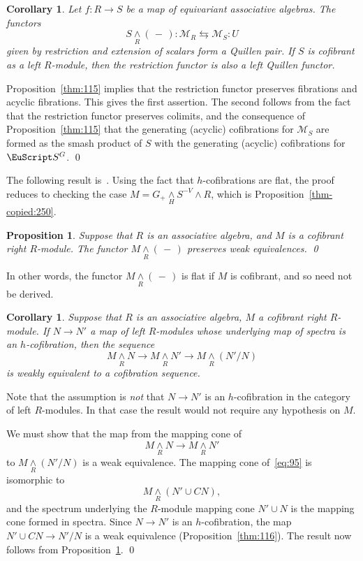 \documentclass{amsart}
\newtheorem{cor}[equation]{Corollary}
\newtheorem{prop}[equation]{Proposition}
\theoremstyle{definition}
\theoremstyle{remark}
\newenvironment{pf}{\bigskip{\em Proof:\/}}{\qed\medskip}
\newcommand{\slot}{\,-\,}
\newcommand{\spectra}{\EuScript S}
\newcommand{\rmod}[1]{\mathcal M_{#1}}
\newcommand{\smashove}[1]{\underset{#1}{\wedge}}
\newcommand{\ugspectra}[1]{\spectra^{#1}}
\begin{document}
\begin{cor}
\label{thm:13}
Let $f:R\to S$ be a map of equivariant associative  algebras.   The
functors 
\[
S\smashove{R}(\slot): \rmod{R} \leftrightarrows \rmod{S}:U
\]
given by restriction and extension of scalars form a Quillen pair.  If
$S$ is cofibrant as a left $R$-module, then the restriction functor is
also a left Quillen functor.
\end{cor}

\begin{pf}
Proposition~\ref{thm:115} implies that the restriction functor
preserves fibrations and acyclic fibrations.  This gives the first
assertion.  The second follows from the fact that the restriction
functor preserves colimits, and the consequence of
Proposition~\ref{thm:115} that the generating (acyclic) cofibrations
for $\rmod{S}$ are formed as the smash product of $S$ with the
generating (acyclic) cofibrations for $\ugspectra{G}$.
\end{pf}

The following result is~\cite[Proposition~III.7.7]{MR1922205}.  Using
the fact that $h$-cofibrations are flat, the proof reduces to checking
the case $M=G_{+}\smashove{H}S^{-V}\wedge R$, which is
Proposition~\ref{thm-copied:250}.

\begin{prop}
\label{thm:48} Suppose that $R$ is an associative algebra, and $M$ is
a cofibrant right $R$-module.  The functor $M\smashove{R}(\slot)$
preserves weak equivalences.  \qed
\end{prop}

In other words, the functor $M\smashove{R}(\slot)$ is flat if $M$ is
cofibrant, and so need not be derived.   

\begin{cor}
\label{thm:102}
Suppose that $R$ is an associative algebra, $M$ a cofibrant right
$R$-module.   If $N\to N'$ a map of left $R$-modules whose underlying
map of spectra is an $h$-cofibration, then the sequence 
\[
M\smashove{R}N \to M\smashove{R}N' \to M\smashove{R}(N'/N)
\]
is weakly equivalent to a cofibration sequence.   
\end{cor}

Note that the assumption is {\em not} that $N\to N'$ is an
$h$-cofibration in the category of left $R$-modules.  In that case the
result would not require any hypothesis on $M$.

\begin{pf}
We must show that the map from the mapping cone of  
\begin{equation}
\label{eq:95}
M\smashove{R}N \to
M\smashove{R}N'
\end{equation}
to $M\smashove{R}(N'/N)$ is a weak equivalence.  The mapping cone
of~\eqref{eq:95} is isomorphic to 
\[
M\smashove{R}(N'\cup CN), 
\]
and the spectrum underlying the $R$-module mapping cone $N'\cup N$ is
the mapping cone formed in spectra.  Since $N\to N'$ is an
$h$-cofibration, the map $N'\cup CN\to N'/N$ is a weak equivalence
(Proposition~\ref{thm:116}).  The result now follows from
Proposition~\ref{thm:48}.
\end{pf}
\end{document}
